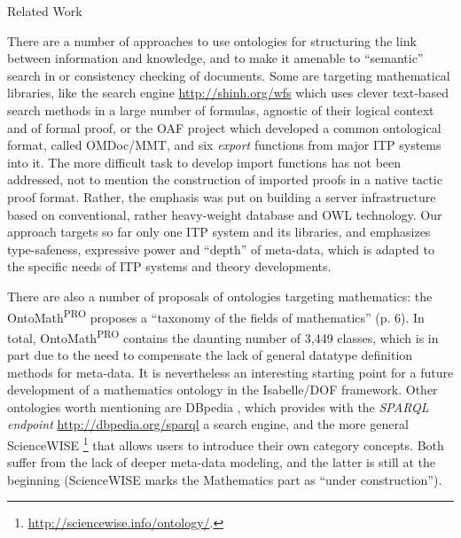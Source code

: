 \begin{isabellebody}
\begin{isamarkupsection*}
[label = {rw},type = {scholarly_paper.related_work}, args={label = {rw},type = {scholarly_paper.related_work}, Isa_COL.text_element.level = {}, Isa_COL.text_element.referentiable = {False}, Isa_COL.text_element.variants = {{STR ''outline'', STR ''document''}}, scholarly_paper.text_section.main_author = {}, scholarly_paper.text_section.fixme_list = {}, Isa_COL.text_element.level = {}, scholarly_paper.text_section.main_author = {}, scholarly_paper.text_section.main_author = {}}]Related Work
\end{isamarkupsection*}\isamarkuptrue%

\begin{isamarkuptext}
There are a number of approaches to use ontologies for structuring the link between
information and knowledge, and to make it amenable to 
 ``semantic'' search in or consistency checking of documents.
Some are targeting mathematical libraries,
like the search engine \url{http://shinh.org/wfs} which uses clever text-based search methods in 
a large number of formulas, agnostic of their logical context and of formal proof,
or the OAF project \cite{KohlhaseR21} which developed a common ontological format,
called  OMDoc/MMT, and six \emph{export} functions from major ITP systems into it.
The more difficult task to develop import functions has not been addressed, not to mention
the construction of imported proofs in a native tactic proof format. Rather, the emphasis
was put on building a server infrastructure based on conventional, rather heavy-weight
database and OWL technology. Our approach targets so far only one ITP system and
its libraries, and emphasizes type-safeness, expressive power and “depth” of meta-data,
which is adapted to the specific needs of ITP systems and theory developments.

There are also a number of proposals of ontologies targeting mathematics:
the OntoMath\textsuperscript{PRO} \cite{Nevzorova2014OntoMathPO} proposes a 
``taxonomy of the fields of mathematics'' (p. 6).
In total, OntoMath\textsuperscript{PRO} contains the daunting number of 3,449 classes,
which is in part due to the need to compensate
the lack of general datatype definition methods for meta-data.
It is nevertheless an interesting starting point for a future development of a mathematics ontology
in the Isabelle/DOF framework.
Other ontologies worth mentioning are DBpedia \cite{10.1007/978-3-540-76298-0_52}, 
which provides with the \emph{SPARQL endpoint}  \url{http://dbpedia.org/sparql} a search engine, 
and the more general ScienceWISE \footnote{\url{http://sciencewise.info/ontology/}.}
that allows users to introduce their own category concepts.
Both suffer from the lack of deeper meta-data modeling, and the latter is still at the beginning
(ScienceWISE marks the Mathematics part as ``under construction'').


\end{isamarkuptext}
\end{isabellebody}
